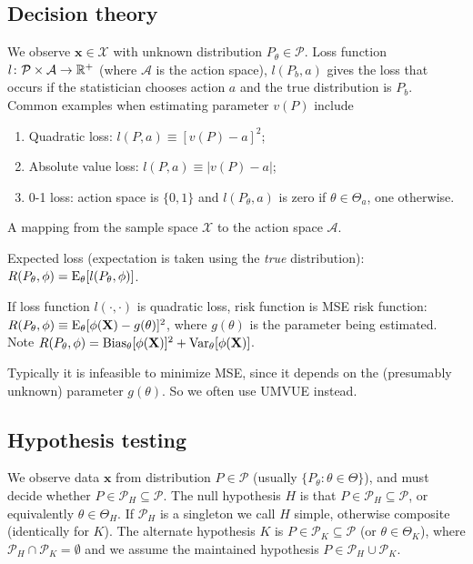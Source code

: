 \documentclass[8pt,letterpaper, landscape]{extarticle} %
\newcommand{\mX}{\ensuremath{\mathbf{X}}}
\newcommand{\mx}{\ensuremath{\mathbf{x}}}
\begin{document}
\begin{multicols}{3}
\begin{description}
\subsection{Decision theory}
 We observe $ \mx \in \mathcal{X} $ with unknown distribution $ P_\theta \in \mathcal{P} $. Loss function $ l \colon \mathcal{P} \times \mathcal{A} \to \mathbb{R}^+ $ (where $ \mathcal{A} $ is the action space), $ l(P_b, a) $ gives the loss that occurs if the statistician chooses action $ a $ and the true distribution is $ P_b $. Common examples when estimating parameter $ v(P) $ include
\begin{enumerate}
\item Quadratic loss: $ l(P,a) \equiv [v(P) - a]^2 $;
\item Absolute value loss: $ l(P,a) \equiv | v(P) - a | $;
\item 0-1 loss: action space is $ \{ 0,1 \} $ and $ l(P_\theta,a) $ is zero if $ \theta \in \Theta_a $, one otherwise.
\end{enumerate}

 A mapping from the sample space $ \mathcal{X} $ to the action space $ \mathcal{A} $.

 Expected loss (expectation is taken using the \textit{true} distribution): $ R(P_\theta , \phi) = \operatorname{E}_\theta [l(P_\theta, \phi)] $.

 If loss function $ l(\cdot, \cdot) $ is quadratic loss, risk function is MSE risk function: $ R(P_\theta, \phi) \equiv \E_\theta [\phi(\mX) - g(\theta)]^2 $, where $ g(\theta) $ is the parameter being estimated. Note $ R(P_\theta, \phi) = \operatorname{Bias}_\theta [\phi(\mX)]^2 + \Var_\theta [\phi(\mX)] $.

Typically it is infeasible to minimize MSE, since it depends on the (presumably unknown) parameter $ g(\theta) $. So we often use UMVUE instead.

\subsection{Hypothesis testing}
 We observe data $ \mx $ from distribution $ P \in \mathcal{P} $ (usually $ \{ P_\theta \colon \theta \in \Theta \} $), and must decide whether $ P \in \mathcal{P}_H \subseteq \mathcal{P} $. The null hypothesis $ H $ is that $ P \in \mathcal{P}_H \subseteq \mathcal{P} $, or equivalently $ \theta \in \Theta_H $. If $ \mathcal{P}_H $ is a singleton we call $ H $ simple, otherwise composite (identically for $ K $). The alternate hypothesis $ K $ is $ P \in \mathcal{P}_K \subseteq \mathcal{P} $ (or $ \theta \in \Theta_K $), where $ \mathcal{P}_H \cap \mathcal{P}_K = \emptyset $ and we assume the maintained hypothesis $ P \in \mathcal{P}_H \cup \mathcal{P}_K $.


\end{description}
\end{multicols}
\end{document}
